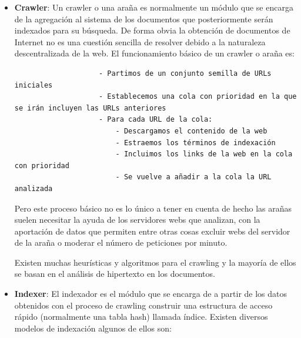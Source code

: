 \documentclass[a4paper, 11pt]{article} %
\begin{document}
		\begin{itemize}
			\item \textbf{Crawler}: Un crawler o una araña es normalmente un módulo que se encarga de la agregación al sistema de los documentos que posteriormente serán indexados para su búsqueda. De forma obvia la obtención de documentos de Internet no es una cuestión sencilla de resolver debido a la naturaleza descentralizada de la web. El funcionamiento básico de un crawler o araña es:
				\begin{verbatim}
					- Partimos de un conjunto semilla de URLs iniciales
					- Establecemos una cola con prioridad en la que se irán incluyen las URLs anteriores
					- Para cada URL de la cola:
					    - Descargamos el contenido de la web
					    - Estraemos los términos de indexación
					    - Incluimos los links de la web en la cola con prioridad
					    - Se vuelve a añadir a la cola la URL analizada
				\end{verbatim}
				Pero este proceso básico no es lo único a tener en cuenta de hecho las arañas suelen necesitar la ayuda de los servidores webs que analizan, con la aportación de datos que permiten entre otras cosas excluir webs del servidor de la araña o moderar el número de peticiones por minuto.

				Existen muchas heurísticas y algoritmos para el crawling y la mayoría de ellos se basan en el análisis de hipertexto en los documentos.
			\item \textbf{Indexer}: El indexador es el módulo que se encarga de a partir de los datos obtenidos con el proceso de crawling construir una estructura de acceso rápido (normalmente una tabla hash) llamada índice. Existen diversos modelos de indexación algunos de ellos son:


\end{itemize}
\end{document}
